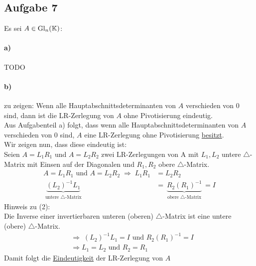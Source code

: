 \subsection*{Aufgabe 7}
Es sei $A \in \mathrm{Gl}_n (\mathbb K)$: 
\paragraph*{a)}
TODO






\paragraph*{b)}
zu zeigen: Wenn alle Hauptabschnittsdeterminanten von $A$ verschieden von 0 sind, dann ist die LR-Zerlegung von $A$ ohne Pivotisierung eindeutig.\\
\newline
Aus Aufgabenteil a) folgt, dass \glqq wenn alle Hauptabschnittsdeterminanten von $A$ verschieden von 0 sind, $A$ eine LR-Zerlegung ohne Pivotisierung \underline{besitzt}.\grqq\\
\newline
Wir zeigen nun, dass diese eindeutig ist:\\
\newline
Seien $ A = L_1R_1 $ und $ A = L_2R_2 $ zwei LR-Zerlegungen von A mit $L_1,L_2$ untere $\triangle$-Matrix mit Einsen auf der Diagonalen und $R_1,R_2$ obere $\triangle$-Matrix.
\begin{align}
	 A = L_1R_1 \text{ und } A = L_2R_2 \;\Rightarrow \; L_1R_1 &=  L_2R_2\\
	 \underbrace{(L_2)^{-1}L_1}_{\substack{\text{untere }\triangle\text{-Matrix}}}
	 &=  \underbrace{R_2(R_1)^{-1}}_{\substack{\text{obere }\triangle\text{-Matrix}}} = I
\end{align}
Hinweis zu (2):\\ Die Inverse einer invertierbaren unteren (oberen) $\triangle$-Matrix ist eine untere (obere) $\triangle$-Matrix.\\
\begin{align}
&\Rightarrow \; (L_2)^{-1}L_1 = I \text{ und } R_2(R_1)^{-1}=I\\
&\Rightarrow L_1=L_2 \text{ und } R_2=R_1
\end{align}
Damit folgt die \underline{Eindeutigkeit} der LR-Zerlegung von $A$